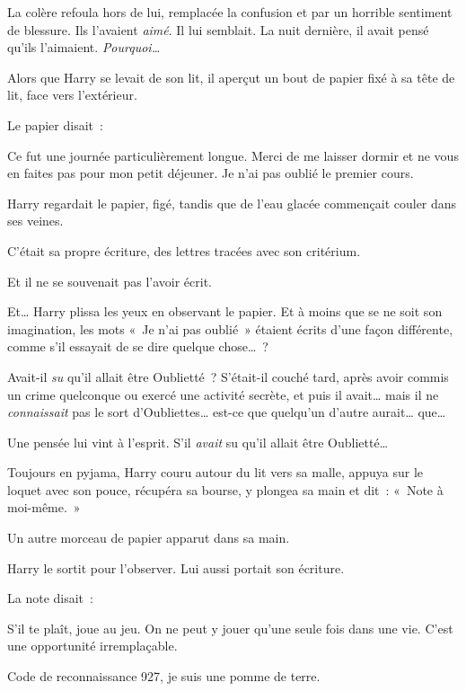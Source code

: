 La colère refoula hors de lui, remplacée la confusion et par un horrible sentiment de blessure.
Ils l'avaient \emph{aimé}. Il lui semblait.
La nuit dernière, il avait pensé qu'ils l'aimaient. \emph{Pourquoi…}

Alors que Harry se levait de son lit, il aperçut un bout de papier fixé à sa tête de lit, face vers l'extérieur.

Le papier disait~:

\begin{writtenNote}

Ce fut une journée particulièrement longue. Merci de me laisser dormir et ne vous en faites pas pour mon petit déjeuner. Je n'ai pas oublié le premier cours.

\end{writtenNote}

Harry regardait le papier, figé, tandis que de l'eau glacée commençait couler dans ses veines.

C'était sa propre écriture, des lettres tracées avec son critérium.

Et il ne se souvenait pas l'avoir écrit.

Et… Harry plissa les yeux en observant le papier.
Et à moins que se ne soit son imagination, les mots «~Je n'ai pas oublié~» étaient écrits d'une façon différente, comme s'il essayait de se dire quelque chose…~?

Avait-il \emph{su} qu'il allait être Oublietté~?
S'était-il couché tard, après avoir commis un crime quelconque ou exercé une activité secrète, et puis il avait… mais il ne \emph{connaissait} pas le sort d'Oubliettes… est-ce que quelqu'un d'autre aurait… que…

Une pensée lui vint à l'esprit.
S'il \emph{avait} su qu'il allait être Oublietté…

Toujours en pyjama, Harry couru autour du lit vers sa malle, appuya sur le loquet avec son pouce, récupéra sa bourse, y plongea sa main et dit~: «~Note à moi-même.~»

Un autre morceau de papier apparut dans sa main.

Harry le sortit pour l'observer. Lui aussi portait son écriture.

La note disait~:

\begin{writtenNote}

S'il te plaît, joue au jeu.
On ne peut y jouer qu'une seule fois dans une vie.
C'est une opportunité irremplaçable.

Code de reconnaissance 927, je suis une pomme de terre.

\end{writtenNote}


